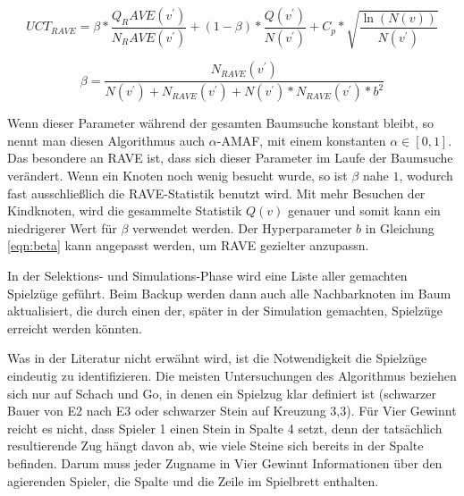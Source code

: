 \begin{equation}
UCT_{RAVE}=\beta * \frac{Q_RAVE(v^\prime)}{N_RAVE(v^\prime)} + (1-\beta) * \frac{Q(v^\prime)}{N(v^\prime)} + C_p * \sqrt{\frac{\ln(N(v))}{N(v^\prime)}}
\label{eqn:uct-rave}
\end{equation}

\begin{equation}
\beta = \frac{N_{RAVE}(v^\prime)}{N(v^\prime)+N_{RAVE}(v^\prime)+N(v^\prime)*N_{RAVE}(v^\prime)*b^2}
\label{eqn:beta}
\end{equation}


Wenn dieser Parameter während der gesamten Baumsuche konstant bleibt, so nennt man diesen Algorithmus auch $\alpha$-AMAF, mit einem konstanten $\alpha \in [0,1]$. Das besondere an RAVE ist, dass sich dieser Parameter im Laufe der Baumsuche verändert. Wenn ein Knoten noch wenig besucht wurde, so ist $\beta$ nahe $1$, wodurch fast ausschließlich die RAVE-Statistik benutzt wird. Mit mehr Besuchen der Kindknoten, wird die gesammelte Statistik $Q(v)$ genauer und somit kann ein niedrigerer Wert für $\beta$ verwendet werden. Der Hyperparameter $b$ in Gleichung \ref{eqn:beta} kann angepasst werden, um RAVE gezielter anzupassn.

In der Selektions- und Simulations-Phase wird eine Liste aller gemachten Spielzüge geführt. Beim Backup werden dann auch alle Nachbarknoten im Baum aktualisiert, die durch einen der, später in der Simulation gemachten, Spielzüge erreicht werden könnten.

Was in der Literatur nicht erwähnt wird, ist die Notwendigkeit die Spielzüge eindeutig zu identifizieren. Die meisten Untersuchungen des Algorithmus beziehen sich nur auf Schach und Go, in denen ein Spielzug klar definiert ist (schwarzer Bauer von E2 nach E3 oder schwarzer Stein auf Kreuzung 3,3).
Für Vier Gewinnt reicht es nicht, dass Spieler 1 einen Stein in Spalte 4 setzt, denn der tatsächlich resultierende Zug hängt davon ab, wie viele Steine sich bereits in der Spalte befinden. Darum muss jeder Zugname in Vier Gewinnt Informationen über den agierenden Spieler, die Spalte und die Zeile im Spielbrett enthalten.

